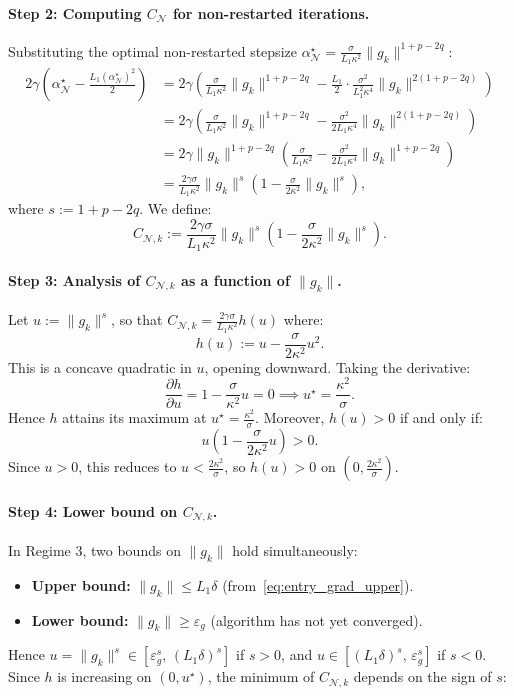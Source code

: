 \documentclass{article}
\begin{document}
\paragraph{Step 2: Computing $C_{\mathcal{N}}$ for non-restarted iterations.}
Substituting the optimal non-restarted stepsize 
$\alpha^\star_{\mathcal{N}} = \frac{\sigma}{L_1\kappa^2}\|g_k\|^{1+p-2q}$:
\begin{align*}
2\gamma\!\left(\alpha^\star_{\mathcal{N}} - \frac{L_1(\alpha^\star_{\mathcal{N}})^2}{2}\right)
&= 2\gamma\!\left(\frac{\sigma}{L_1\kappa^2}\|g_k\|^{1+p-2q} 
   - \frac{L_1}{2}\cdot\frac{\sigma^2}{L_1^2\kappa^4}\|g_k\|^{2(1+p-2q)}\right) \\
&= 2\gamma\left(\frac{\sigma}{L_1\kappa^2}\|g_k\|^{1+p-2q} 
   - \frac{\sigma^2}{2L_1\kappa^4}\|g_k\|^{2(1+p-2q)}\right) \\
&= 2\gamma\|g_k\|^{1+p-2q}\left(\frac{\sigma}{L_1\kappa^2} 
   - \frac{\sigma^2}{2L_1\kappa^4}\|g_k\|^{1+p-2q}\right) \\
&= \frac{2\gamma\sigma}{L_1\kappa^2}\|g_k\|^{s}
   \left(1 - \frac{\sigma}{2\kappa^2}\|g_k\|^{s}\right),
\end{align*}
where $s := 1+p-2q$. We define:
\begin{equation}
\label{eq:C_N}
C_{\mathcal{N},k} := \frac{2\gamma\sigma}{L_1\kappa^2}\|g_k\|^{s}
\left(1 - \frac{\sigma}{2\kappa^2}\|g_k\|^{s}\right).
\end{equation}

\paragraph{Step 3: Analysis of $C_{\mathcal{N},k}$ as a function of $\|g_k\|$.}
Let $u := \|g_k\|^s$, so that $C_{\mathcal{N},k} = \frac{2\gamma\sigma}{L_1\kappa^2}h(u)$ where:
\[
h(u) := u - \frac{\sigma}{2\kappa^2}u^2.
\]
This is a concave quadratic in $u$, opening downward. Taking the derivative:
\[
\frac{\partial h}{\partial u} = 1 - \frac{\sigma}{\kappa^2}u = 0 
\implies u^\star = \frac{\kappa^2}{\sigma}.
\]
Hence $h$ attains its maximum at $u^\star = \frac{\kappa^2}{\sigma}$. 
Moreover, $h(u) > 0$ if and only if:
\[
u\!\left(1 - \frac{\sigma}{2\kappa^2}u\right) > 0.
\]
Since $u > 0$, this reduces to $u < \frac{2\kappa^2}{\sigma}$, 
so $h(u) > 0$ on $\left(0, \frac{2\kappa^2}{\sigma}\right)$.

\paragraph{Step 4: Lower bound on $C_{\mathcal{N},k}$.}
In Regime 3, two bounds on $\|g_k\|$ hold simultaneously:
\begin{itemize}
    \item \textbf{Upper bound:} $\|g_k\| \leq L_1\delta$ 
    (from~\eqref{eq:entry_grad_upper}).
    \item \textbf{Lower bound:} $\|g_k\| \geq \varepsilon_g$ 
    (algorithm has not yet converged).
\end{itemize}
Hence $u = \|g_k\|^s \in \left[\varepsilon_g^s,\, (L_1\delta)^s\right]$ if $s > 0$, 
and $u \in \left[(L_1\delta)^s,\, \varepsilon_g^s\right]$ if $s < 0$. 
Since $h$ is increasing on $(0, u^\star)$, the minimum of $C_{\mathcal{N},k}$ 
depends on the sign of $s$:
\end{document}
